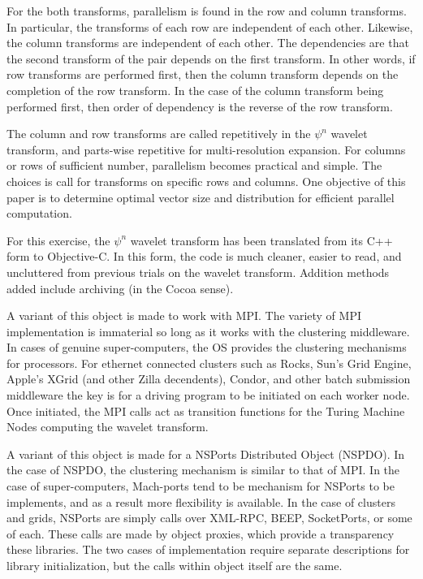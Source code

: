 \documentclass[11pt]{article}
\begin{document}
For the both transforms, parallelism is found in the row and column transforms.  In particular, the transforms of each row are independent of each other.  Likewise, the column transforms are independent of each other.  The dependencies are that the second transform of the pair depends on the first transform.  In other words, if row transforms are performed first, then the column transform depends on the completion of the row transform.   In the case of the column transform being performed first, then order of dependency is the reverse of the row transform.   

The column and row transforms are called repetitively in the $\psi^n$ wavelet transform,  and parts-wise repetitive for multi-resolution expansion.  For columns or rows of sufficient number, parallelism becomes practical and simple.  The choices is call for transforms on specific rows and columns.  One objective of this paper is to determine optimal vector size and distribution for efficient parallel computation.  

For this exercise, the $\psi^n$ wavelet transform has been translated from its C++ form to Objective-C.  In this form, the code is much cleaner, easier to read, and uncluttered from previous trials on the wavelet transform.  Addition methods added include archiving (in the Cocoa sense).  

A variant of this object is made to work with MPI.  The variety of MPI implementation is immaterial so long as it works with the clustering middleware.  In cases of genuine super-computers, the OS provides the clustering mechanisms for processors.   For ethernet connected clusters such as Rocks, Sun's Grid Engine, Apple's XGrid (and other Zilla decendents), Condor, and other batch submission middleware the key is for a driving program to be initiated on each worker node.  Once initiated, the MPI calls act as transition functions for the Turing Machine Nodes computing the wavelet transform.  

A variant of this object is made for a NSPorts Distributed Object (NSPDO).  In the case of NSPDO, the clustering mechanism is similar to that of MPI.  In the case of super-computers, Mach-ports tend to be mechanism for NSPorts to be implements, and as a result more flexibility is available.  In the case of clusters and grids,  NSPorts are simply calls over XML-RPC, BEEP, SocketPorts, or some of each.  These calls are made by object proxies, which provide a transparency these libraries.  The two cases of implementation require separate descriptions for library initialization, but the calls within object itself are the same. 
\end{document}
